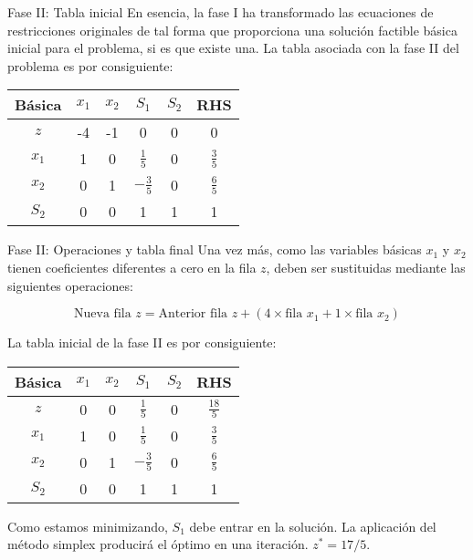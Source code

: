 \documentclass{beamer}
\begin{document}
\begin{frame}{Fase II: Tabla inicial}
    En esencia, la fase I ha transformado las ecuaciones de restricciones originales de tal forma que proporciona una solución factible básica inicial para el problema, si es que existe una. La tabla asociada con la fase II del problema es por consiguiente:

    \begin{table}
    \centering
    \begin{tabular}{c|c c c c|c}
    Básica & $x_1$ & $x_2$ & $S_1$ & $S_2$ & RHS \\
    \hline
    $z$   & -4 & -1 & 0 & 0 & 0 \\
    $x_1$ & 1 & 0 & $\frac{1}{5}$ & 0 & $\frac{3}{5}$ \\
    $x_2$ & 0 & 1 & $-\frac{3}{5}$ & 0 & $\frac{6}{5}$ \\
    $S_2$ & 0 & 0 & 1 & 1 & 1 \\
    \end{tabular}
    \end{table}
\end{frame}

\begin{frame}{Fase II: Operaciones y tabla final}
    Una vez más, como las variables básicas $x_1$ y $x_2$ tienen coeficientes diferentes a cero en la fila $z$, deben ser sustituidas mediante las siguientes operaciones:

    \[
    \text{Nueva fila } z = \text{Anterior fila } z + (4 \times \text{fila } x_1 + 1 \times \text{fila } x_2)
    \]

    La tabla inicial de la fase II es por consiguiente:

    \begin{table}
    \centering
    \begin{tabular}{c|c c c c|c}
    Básica & $x_1$ & $x_2$ & $S_1$ & $S_2$ & RHS \\
    \hline
    $z$   & 0 & 0 & $\frac{1}{5}$ & 0 & $\frac{18}{5}$ \\
    $x_1$ & 1 & 0 & $\frac{1}{5}$ & 0 & $\frac{3}{5}$ \\
    $x_2$ & 0 & 1 & $-\frac{3}{5}$ & 0 & $\frac{6}{5}$ \\
    $S_2$ & 0 & 0 & 1 & 1 & 1 \\
    \end{tabular}
    \end{table}

    Como estamos minimizando, $S_1$ debe entrar en la solución. La aplicación del método simplex producirá el óptimo en una iteración. $z^*=17/5$.
\end{frame}
\end{document}
